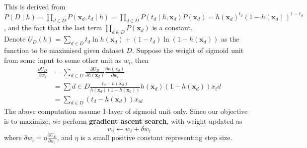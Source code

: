 \documentclass[12pt]{article}
\theoremstyle{definition}
\begin{document}
This is derived from $P(D\mid h)=\prod_{d\in D}P(\mathbf{x}_d, t_d\mid h)=\prod_{d\in D}P(t_d\mid h, \mathbf{x}_d)P(\mathbf{x}_d)=h(\mathbf{x}_d)^{{t}_d}(1-h(\mathbf{x}_d))^{1-t_d}$, and the fact that the last term $\prod_{d\in D}P(\mathbf{x}_d)$ is a constant.\\
Denote $U_D(h) = \sum_{d\in D}t_d\ln h(\mathbf{x}_d)+(1-t_d)\ln(1-h(\mathbf{x}_d))$ as the function to be maximised given dataset $D$. Suppose the weight of sigmoid unit from some input to some other unit as $w_i$, then
\begin{align*}
\frac{\partial U_D}{\partial w_i}&=\sum_{d\in D}\frac{\partial U_D}{\partial h(\mathbf{x}_d)}\frac{\partial h(\mathbf{x}_d)}{\partial w_i}\\
&=\sum{d\in D}\frac{t_d-h(\mathbf{x}_d)}{h(\mathbf{x}_d)(1-h(\mathbf{x}_d))}h(\mathbf{x}_d)(1-h(\mathbf{x}_d))x_id\\
&=\sum_{d\in D}(t_d-h(\mathbf{x}_d))x_{id}
\end{align*}
The above computation assume 1 layer of sigmoid unit only. Since our objective is to maximize, we perform \textbf{gradient ascent search}, with weight updated as
\[
w_i\leftarrow w_i+\delta w_i
\]
where $\delta w_i=\eta \frac{\partial U_D}{\partial w_i}$, and $\eta$ is a small positive constant representing step size.\\
\end{document}
